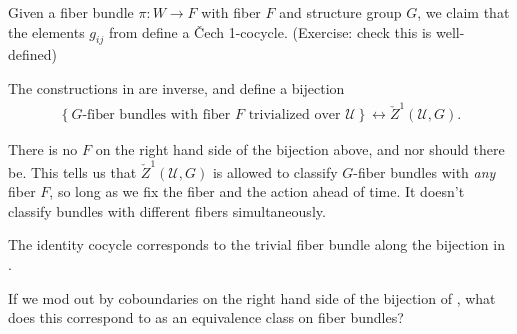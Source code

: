 \documentclass[11pt]{amsart}
\begin{document}
\begin{construction}
\label{constr:cocycle-from-fiber-bundle}
Given a fiber bundle $\pi \colon W \to F$ with fiber $F$ and structure group $G$, we claim that the elements $g_{ij}$ from  define a \v{C}ech 1-cocycle. (Exercise: check this is well-defined)
\end{construction}

\begin{theorem}\label{thm:Z1-bij-to-fiber-bundles} 
The constructions in  are inverse, and define a bijection
\begin{equation}\label{eqn:cocycle-fiber-bundle-bijection}
\begin{aligned}
    \left\{ G\text{-fiber bundles with fiber }F\text{ trivialized over }\mathcal{U} \right\} \leftrightarrow \check{Z}^1(\mathcal{U},G).
\end{aligned}
\end{equation}
\end{theorem}

\begin{remark}[Important] There is no $F$ on the right hand side of the bijection above, and nor should there be. This tells us that $\check{Z}^1(\mathcal{U},G)$ is allowed to classify $G$-fiber bundles with \emph{any} fiber $F$, so long as we fix the fiber and the action ahead of time. It doesn't classify bundles with different fibers simultaneously.
\end{remark}


\begin{example}
\label{exa:identity-cocycle-trivial-fiber-bundle}
The identity cocycle corresponds to the trivial fiber bundle along the bijection in .
\end{example}


\begin{question} If we mod out by coboundaries on the right hand side of the bijection of , what does this correspond to as an equivalence class on fiber bundles?
\end{question}
\end{document}
